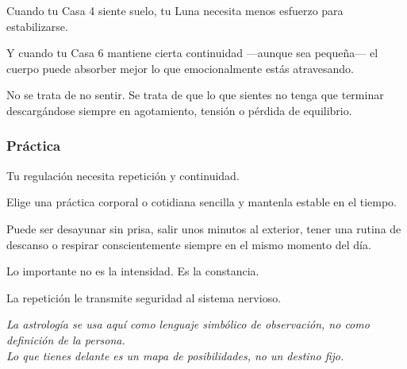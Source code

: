 \documentclass[11pt,a4paper]{article}
\begin{document}
Cuando tu Casa 4 siente suelo, tu Luna necesita menos esfuerzo para estabilizarse.

Y cuando tu Casa 6 mantiene cierta continuidad —aunque sea pequeña— el cuerpo puede absorber mejor lo que emocionalmente estás atravesando.

No se trata de no sentir.
Se trata de que lo que sientes no tenga que terminar descargándose siempre en agotamiento, tensión o pérdida de equilibrio.

\subsubsection*{Práctica}

Tu regulación necesita repetición y continuidad.

Elige una práctica corporal o cotidiana sencilla y mantenla estable en el tiempo.

Puede ser desayunar sin prisa, salir unos minutos al exterior, tener una rutina de descanso o respirar conscientemente siempre en el mismo momento del día.

Lo importante no es la intensidad.
Es la constancia.

La repetición le transmite seguridad al sistema nervioso.

\vspace{0.6cm}

\begin{center}
{\small\itshape\color{grisai}
La astrología se usa aquí como lenguaje simbólico de observación, no como definición de la persona.\\
Lo que tienes delante es un mapa de posibilidades, no un destino fijo.
}
\end{center}
\end{document}
